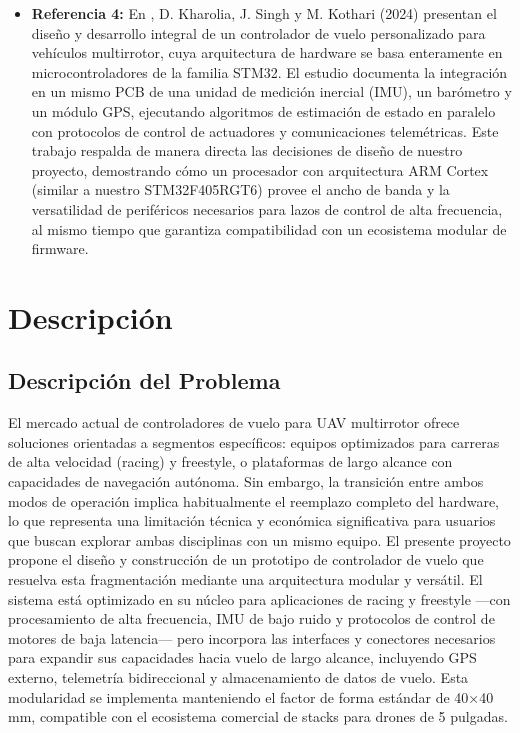 \documentclass[12pt, letterpaper]{report}
\begin{document}
\begin{itemize}
    \item \textbf{Referencia 4:} En \cite{ref4}, D. Kharolia, J. Singh y M. Kothari (2024) presentan el diseño y desarrollo integral de un controlador de vuelo personalizado para vehículos multirrotor, cuya arquitectura de hardware se basa enteramente en microcontroladores de la familia STM32. El estudio documenta la integración en un mismo PCB de una unidad de medición inercial (IMU), un barómetro y un módulo GPS, ejecutando algoritmos de estimación de estado en paralelo con protocolos de control de actuadores y comunicaciones telemétricas. Este trabajo respalda de manera directa las decisiones de diseño de nuestro proyecto, demostrando cómo un procesador con arquitectura ARM Cortex (similar a nuestro STM32F405RGT6) provee el ancho de banda y la versatilidad de periféricos necesarios para lazos de control de alta frecuencia, al mismo tiempo que garantiza compatibilidad con un ecosistema modular de firmware.
\end{itemize}

\section{Descripción}
\subsection{Descripción del Problema}
El mercado actual de controladores de vuelo para UAV multirrotor ofrece soluciones orientadas a segmentos específicos: equipos optimizados para carreras de alta velocidad (racing) y freestyle, o plataformas de largo alcance con capacidades de navegación autónoma. Sin embargo, la transición entre ambos modos de operación implica habitualmente el reemplazo completo del hardware, lo que representa una limitación técnica y económica significativa para usuarios que buscan explorar ambas disciplinas con un mismo equipo.
El presente proyecto propone el diseño y construcción de un prototipo de controlador de vuelo que resuelva esta fragmentación mediante una arquitectura modular y versátil. El sistema está optimizado en su núcleo para aplicaciones de racing y freestyle —con procesamiento de alta frecuencia, IMU de bajo ruido y protocolos de control de motores de baja latencia— pero incorpora las interfaces y conectores necesarios para expandir sus capacidades hacia vuelo de largo alcance, incluyendo GPS externo, telemetría bidireccional y almacenamiento de datos de vuelo. Esta modularidad se implementa manteniendo el factor de forma estándar de 40×40 mm, compatible con el ecosistema comercial de stacks para drones de 5 pulgadas.
\end{document}
